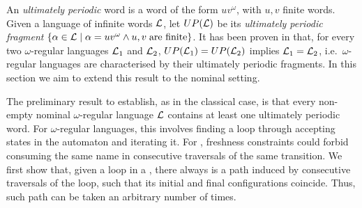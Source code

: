 %
%
%
An \emph{ultimately periodic} word is a word of the form $uv^\omega$, with $u,v$ finite words. Given a language of infinite words $\mathcal{L}$, let $UP(\mathcal{L})$ be its \emph{ultimately periodic fragment} $\{ \alpha \in \mathcal{L} \mid \alpha = uv^\omega \land u,v \; \text{are finite} \}$. It has been proven in \cite{CalbrixNP93,Buchi62} that, for every two $\omega$-regular languages $\mathcal{L}_1$ and $\mathcal{L}_2$, $UP(\mathcal{L}_1) = UP(\mathcal{L}_2)$ implies $\mathcal{L}_1 = \mathcal{L}_2$, i.e.\ $\omega$-regular languages are characterised by their ultimately periodic fragments.
In this section we aim to extend this result to the nominal setting. 

The preliminary result to establish, as in the classical case, is that every non-empty nominal $\omega$-regular language $\mathcal{L}$ contains at least one ultimately periodic word. For $\omega$-regular languages, this involves finding a loop through accepting states in the automaton and iterating it. 
For \hdmas, freshness constraints could forbid consuming the same name in consecutive traversals of the same transition.
We first show that, 
given a loop in a \hdma{}, there always is a path induced by consecutive traversals of the loop, such that its initial and final configurations coincide. Thus, such path can be taken an arbitrary number of times.

